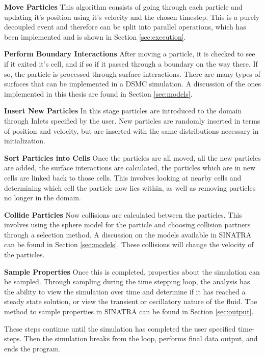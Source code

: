 \indent \textbf{Move Particles} This algorithm consists of going through each particle and updating it's position using it's velocity and the chosen timestep. This is a purely decoupled event and therefore can be split into parallel operations, which has been implemented and is shown in Section \ref{sec:execution}. \par

\indent \textbf{Perform Boundary Interactions} After moving a particle, it is checked to see if it exited it's cell, and if so if it passed through a boundary on the way there. If so, the particle is processed through surface interactions. There are many types of surfaces that can be implemented in a DSMC simulation. A discussion of the ones implemented in this thesis are found in Section \ref{sec:models}. \par

\indent \textbf{Insert New Particles} In this stage particles are introduced to the domain through Inlets specified by the user. New particles are randomly inserted in terms of position and velocity, but are inserted with the same distributions necessary in initialization. \par

\indent \textbf{Sort Particles into Cells} Once the particles are all moved, all the new particles are added, the surface interactions are calculated, the particles which are in new cells are linked back to those cells. This involves looking at nearby cells and determining which cell the particle now lies within, as well as removing particles no longer in the domain. \par

\indent \textbf{Collide Particles} Now collisions are calculated between the particles. This involves using the sphere model for the particle and choosing collision partners through a selection method. A discussion on the models available in SINATRA can be found in Section \ref{sec:models}. These collisions will change the velocity of the particles. \par

\indent \textbf{Sample Properties} Once this is completed, properties about the simulation can be sampled. Through sampling during the time stepping loop, the analysis has the ability to view the simulation over time and determine if it has reached a steady state solution, or view the transient or oscillatory nature of the fluid. The method to sample properties in SINATRA can be found in Section \ref{sec:output}. \par

These steps continue until the simulation has completed the user specified time-steps. Then the simulation breaks from the loop, performs final data output, and ends the program. 




